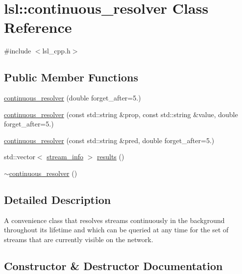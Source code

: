 \hypertarget{classlsl_1_1continuous__resolver}{}\section{lsl\+:\+:continuous\+\_\+resolver Class Reference}
\label{classlsl_1_1continuous__resolver}


{\ttfamily \#include $<$lsl\+\_\+cpp.\+h$>$}

\subsection*{Public Member Functions}
\begin{DoxyCompactItemize}
\item 
\hyperlink{classlsl_1_1continuous__resolver_a53b81e4328aba7a83c4aa129fa0d6f62}{continuous\+\_\+resolver} (double forget\+\_\+after=5.)
\item 
\hyperlink{classlsl_1_1continuous__resolver_a9eb3d09ca9c4f9c493a6978d403a5144}{continuous\+\_\+resolver} (const std\+::string \&prop, const std\+::string \&value, double forget\+\_\+after=5.)
\item 
\hyperlink{classlsl_1_1continuous__resolver_aa3b65921342bddafabe4e5d16a3c24a3}{continuous\+\_\+resolver} (const std\+::string \&pred, double forget\+\_\+after=5.)
\item 
std\+::vector$<$ \hyperlink{classlsl_1_1stream__info}{stream\+\_\+info} $>$ \hyperlink{classlsl_1_1continuous__resolver_ad88c16d36f8a2dc64f4ae4536445e15a}{results} ()
\item 
\hyperlink{classlsl_1_1continuous__resolver_a382bc439e5dbb1efcaa32def93ef01df}{$\sim$continuous\+\_\+resolver} ()
\end{DoxyCompactItemize}


\subsection{Detailed Description}
A convenience class that resolves streams continuously in the background throughout its lifetime and which can be queried at any time for the set of streams that are currently visible on the network. 

\subsection{Constructor \& Destructor Documentation}
\mbox{\label{classlsl_1_1continuous__resolver_a53b81e4328aba7a83c4aa129fa0d6f62}} 
